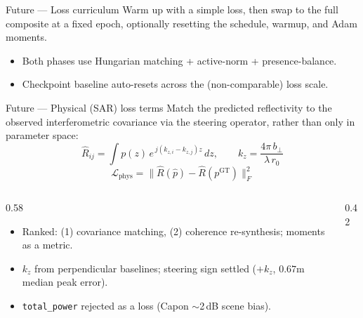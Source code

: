 \documentclass[aspectratio=169,10pt]{beamer}
\begin{document}
\begin{frame}{Future --- Loss curriculum}
  \small
  Warm up with a simple loss, then swap to the full composite at a fixed epoch,
  optionally resetting the schedule, warmup, and Adam moments.
  \begin{center}
  \end{center}
  \begin{itemize}\scriptsize
    \item Both phases use Hungarian matching + active-norm + presence-balance.
    \item Checkpoint baseline auto-resets across the (non-comparable) loss scale.
  \end{itemize}
\end{frame}

\begin{frame}{Future --- Physical (SAR) loss terms}
  \small
  Match the predicted reflectivity to the observed interferometric covariance via the
  steering operator, rather than only in parameter space:
  \[
    \hat R_{ij}=\int p(z)\,e^{\,j(k_{z,i}-k_{z,j})z}\,dz,\qquad
    k_z=\frac{4\pi\,b_\perp}{\lambda\,r_0}
  \]
  \[
    \mathcal{L}_\text{phys}=\big\|\hat R(\hat p)-\hat R(p^\text{GT})\big\|_F^2
  \]
  \begin{columns}[T]
    \begin{column}{0.58\textwidth}
      \begin{itemize}\scriptsize
        \item Ranked: (1) covariance matching, (2) coherence re-synthesis; moments as a metric.
        \item $k_z$ from perpendicular baselines; steering sign settled ($+k_z$, $0.67$m median peak error).
        \item \texttt{total\_power} rejected as a loss (Capon $\sim$2\,dB scene bias).
      \end{itemize}
    \end{column}
    \begin{column}{0.42\textwidth}
      \centering
    \end{column}
  \end{columns}
\end{frame}
\end{document}
